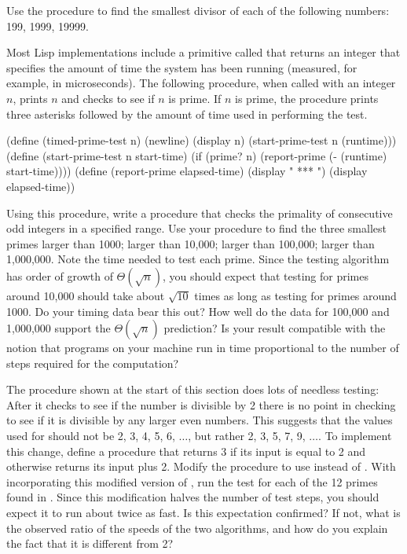 \begin{exerciseGroup}
\label{Exercise 1.21}
 Use the 
procedure to find the smallest divisor of each of the following numbers: 199,
1999, 19999.

\label{Exercise 1.22}
 Most Lisp implementations include
a primitive called  that returns an integer that specifies the
amount of time the system has been running (measured, for example, in
microseconds).  The following  procedure, when called
with an integer \( n \), prints \( n \) and checks to see if \( n \) is prime.  If
\( n \) is prime, the procedure prints three asterisks followed by the amount of
time used in performing the test.

\begin{codeBlock}
(define (timed-prime-test n)
  (newline)
  (display n)
  (start-prime-test n (runtime)))
(define (start-prime-test n start-time)
  (if (prime? n)
      (report-prime (- (runtime) start-time))))
(define (report-prime elapsed-time)
  (display " *** ")
  (display elapsed-time))
\end{codeBlock}

Using this procedure, write a procedure  that checks
the primality of consecutive odd integers in a specified range.  Use your
procedure to find the three smallest primes larger than 1000; larger than
10,000; larger than 100,000; larger than 1,000,000.  Note the time needed to
test each prime.  Since the testing algorithm has order of growth of
\( \Theta(\sqrt{n}) \), you should expect that testing for primes
around 10,000 should take about \( \sqrt{10} \) times as long as testing for
primes around 1000.  Do your timing data bear this out?  How well do the data
for 100,000 and 1,000,000 support the \( \Theta(\sqrt{n}) \) prediction?  Is your
result compatible with the notion that programs on your machine run in time
proportional to the number of steps required for the computation?

\label{Exercise 1.23}
 The 
procedure shown at the start of this section does lots of needless testing:
After it checks to see if the number is divisible by 2 there is no point in
checking to see if it is divisible by any larger even numbers.  This suggests
that the values used for  should not be 2, 3, 4, 5, 6,
\( \dots \), but rather 2, 3, 5, 7, 9, \( \dots \).  To implement this change, define a
procedure  that returns 3 if its input is equal to 2 and otherwise
returns its input plus 2.  Modify the  procedure to use
 instead of .  With
 incorporating this modified version of
, run the test for each of the 12 primes found in
.  Since this modification halves the number of test steps,
you should expect it to run about twice as fast.  Is this expectation
confirmed?  If not, what is the observed ratio of the speeds of the two
algorithms, and how do you explain the fact that it is different from 2?


\end{exerciseGroup}
